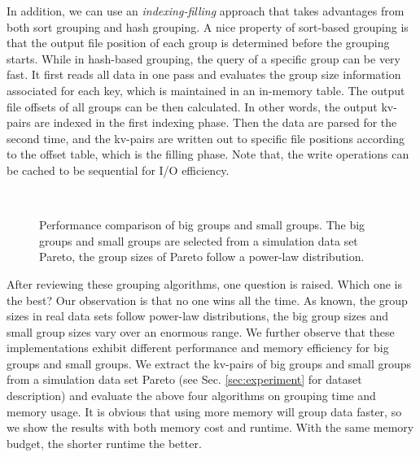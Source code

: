 In addition, we can use an \emph{indexing-filling} approach that takes advantages from both sort grouping and hash grouping. A nice property of sort-based grouping is that the output file position of each group is determined before the grouping starts. While in hash-based grouping, the query of a specific group can be very fast. It first reads all data in one pass and evaluates the group size information associated for each key, which is maintained in an in-memory table. The output file offsets of all groups can be then calculated. In other words, the output kv-pairs are indexed in the first indexing phase. Then the data are parsed for the second time, and the kv-pairs are written out to specific file positions according to the offset table, which is the filling phase. Note that, the write operations can be cached to be sequential for I/O efficiency.

\begin{figure}[t]%
    \hspace{0.23cm}
    \\
\caption{Performance comparison of big groups and small groups. The big groups and small groups are selected from a simulation data set Pareto, the group sizes of Pareto follow a power-law distribution.}
\label{fig: big and small}
\end{figure}

After reviewing these grouping algorithms, one question is raised. Which one is the best? Our observation is that no one wins all the time. As known, the group sizes in real data sets follow power-law distributions, the big group sizes and small group sizes vary over an enormous range. We further observe that these implementations exhibit different performance and memory efficiency for big groups and small groups. We extract the kv-pairs of big groups and small groups from a simulation data set Pareto (see Sec. \ref{sec:experiment} for dataset description) and evaluate the above four algorithms on grouping time and memory usage. It is obvious that using more memory will group data faster, so we show the results with both memory cost and runtime. With the same memory budget, the shorter runtime the better. 

